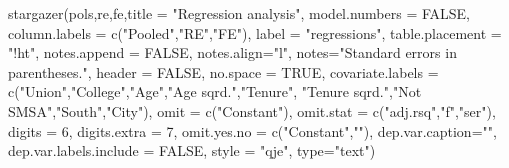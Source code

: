 \documentclass[
]{article}
\newenvironment{Shaded}{\begin{snugshade}}{\end{snugshade}}
\newcommand{\AttributeTok}[1]{\textcolor[rgb]{0.77,0.63,0.00}{#1}}
\newcommand{\ConstantTok}[1]{\textcolor[rgb]{0.00,0.00,0.00}{#1}}
\newcommand{\DecValTok}[1]{\textcolor[rgb]{0.00,0.00,0.81}{#1}}
\newcommand{\FunctionTok}[1]{\textcolor[rgb]{0.00,0.00,0.00}{#1}}
\newcommand{\NormalTok}[1]{#1}
\newcommand{\StringTok}[1]{\textcolor[rgb]{0.31,0.60,0.02}{#1}}
\begin{document}
\begin{Shaded}
\begin{Highlighting}[]
  \FunctionTok{stargazer}\NormalTok{(pols,re,fe,}\AttributeTok{title =} \StringTok{"Regression analysis"}\NormalTok{, }
            \AttributeTok{model.numbers =} \ConstantTok{FALSE}\NormalTok{,}
            \AttributeTok{column.labels =} \FunctionTok{c}\NormalTok{(}\StringTok{"Pooled"}\NormalTok{,}\StringTok{"RE"}\NormalTok{,}\StringTok{"FE"}\NormalTok{),}
            \AttributeTok{label =} \StringTok{"regressions"}\NormalTok{,}
            \AttributeTok{table.placement =} \StringTok{"!ht"}\NormalTok{,}
            \AttributeTok{notes.append =} \ConstantTok{FALSE}\NormalTok{,}
            \AttributeTok{notes.align=}\StringTok{"l"}\NormalTok{,}
            \AttributeTok{notes=}\StringTok{"Standard errors in parentheses."}\NormalTok{,}
            \AttributeTok{header =} \ConstantTok{FALSE}\NormalTok{,}
            \AttributeTok{no.space =} \ConstantTok{TRUE}\NormalTok{,}
            \AttributeTok{covariate.labels =} \FunctionTok{c}\NormalTok{(}\StringTok{"Union"}\NormalTok{,}\StringTok{"College"}\NormalTok{,}\StringTok{"Age"}\NormalTok{,}\StringTok{"Age sqrd."}\NormalTok{,}\StringTok{"Tenure"}\NormalTok{,}
                                 \StringTok{"Tenure sqrd."}\NormalTok{,}\StringTok{"Not SMSA"}\NormalTok{,}\StringTok{"South"}\NormalTok{,}\StringTok{"City"}\NormalTok{),}
            \AttributeTok{omit =} \FunctionTok{c}\NormalTok{(}\StringTok{"Constant"}\NormalTok{),}
            \AttributeTok{omit.stat =} \FunctionTok{c}\NormalTok{(}\StringTok{"adj.rsq"}\NormalTok{,}\StringTok{"f"}\NormalTok{,}\StringTok{"ser"}\NormalTok{),}
            \AttributeTok{digits =} \DecValTok{6}\NormalTok{,}
            \AttributeTok{digits.extra =} \DecValTok{7}\NormalTok{,}
            \AttributeTok{omit.yes.no =} \FunctionTok{c}\NormalTok{(}\StringTok{"Constant"}\NormalTok{,}\StringTok{""}\NormalTok{),}
            \AttributeTok{dep.var.caption=}\StringTok{""}\NormalTok{,}
            \AttributeTok{dep.var.labels.include =} \ConstantTok{FALSE}\NormalTok{,}
            \AttributeTok{style =} \StringTok{"qje"}\NormalTok{,}
            \AttributeTok{type=}\StringTok{"text"}\NormalTok{)}
\end{Highlighting}
\end{Shaded}
\end{document}
